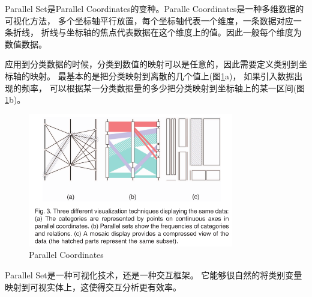 \documentclass{article}
\begin{document}
	Parallel Set是Parallel Coordinates的变种。Paralle Coordinates是一种多维数据的可视化方法，
	多个坐标轴平行放置，每个坐标轴代表一个维度，一条数据对应一条折线，
	折线与坐标轴的焦点代表数据在这个维度上的值。因此一般每个维度为数值数据。

	应用到分类数据的时候，分类到数值的映射可以是任意的，因此需要定义类别到坐标轴的映射。
	最基本的是把分类映射到离散的几个值上(图\ref{fig:parallelcoordinates1}a)，
	如果引入数据出现的频率，
	可以根据某一分类数据量的多少把分类映射到坐标轴上的某一区间(图\ref{fig:parallelcoordinates1}b)。
	\begin{figure}[h]
		\centering
		\includegraphics[width=0.8\textwidth]{"_img/Parallel_Coordinates_1.png"}
		\caption{Parallel Coordinates}
		\label{fig:parallelcoordinates1}
	\end{figure}

	Parallel Set是一种可视化技术，还是一种交互框架。
	它能够很自然的将类别变量映射到可视实体上，这使得交互分析更有效率。
\end{document}
